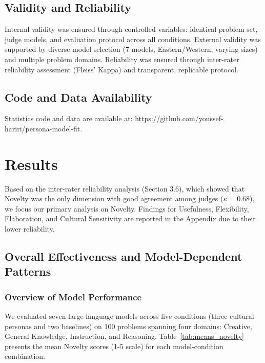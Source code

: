 \documentclass{article}
\begin{document}
\subsection{Validity and Reliability}

Internal validity was ensured through controlled variables: identical problem set, judge models, and evaluation protocol across all conditions. External validity was supported by diverse model selection (7 models, Eastern/Western, varying sizes) and multiple problem domains. Reliability was ensured through inter-rater reliability assessment (Fleiss' Kappa) and transparent, replicable protocol.

\subsection{Code and Data Availability}

 Statistics code and data are available at: https://github.com/youssef-hariri/persona-model-fit.

\section{Results}

Based on the inter-rater reliability analysis (Section 3.6), which showed that Novelty was the only dimension with good agreement among judges (\(\kappa = 0.68\)), we focus our primary analysis on Novelty. Findings for Usefulness, Flexibility, Elaboration, and Cultural Sensitivity are reported in the Appendix due to their lower reliability.

\subsection{Overall Effectiveness and Model-Dependent Patterns}

\subsubsection{Overview of Model Performance}

We evaluated seven large language models across five conditions (three cultural personas and two baselines) on 100 problems spanning four domains: Creative, General Knowledge, Instruction, and Reasoning. Table~\ref{tab:means_novelty} presents the mean Novelty scores (1-5 scale) for each model-condition combination.
\end{document}
